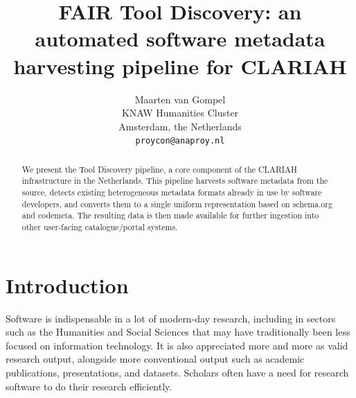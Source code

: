 \documentclass[a4paper,11pt]{article}
\title{FAIR Tool Discovery: an automated software metadata harvesting pipeline for CLARIAH}
\author{Maarten van Gompel \\
  KNAW Humanities Cluster \\
  Amsterdam, the Netherlands \\
  {\tt proycon@anaproy.nl} %
}
\date{}
\begin{document}
\maketitle
\begin{abstract}
  We present the Tool Discovery pipeline, a core component of the CLARIAH
    infrastructure in the Netherlands. This pipeline harvests software metadata
    from the source, detects existing heterogeneous metadata formats already in
    use by software developers, and converts them to a single uniform representation
    based on schema.org and codemeta. The resulting data is then made available
    for further ingestion into other user-facing catalogue/portal systems. 
\end{abstract}

\section{Introduction} \label{intro}

%

Software is indispensable in a lot of modern-day research, including in sectors
such as the Humanities and Social Sciences that may have traditionally been
less focused on information technology. It is also appreciated more and more as
valid research output, alongside more conventional output such as academic
publications, presentations, and datasets. Scholars often have a need for
research software to do their research efficiently.
\end{document}
